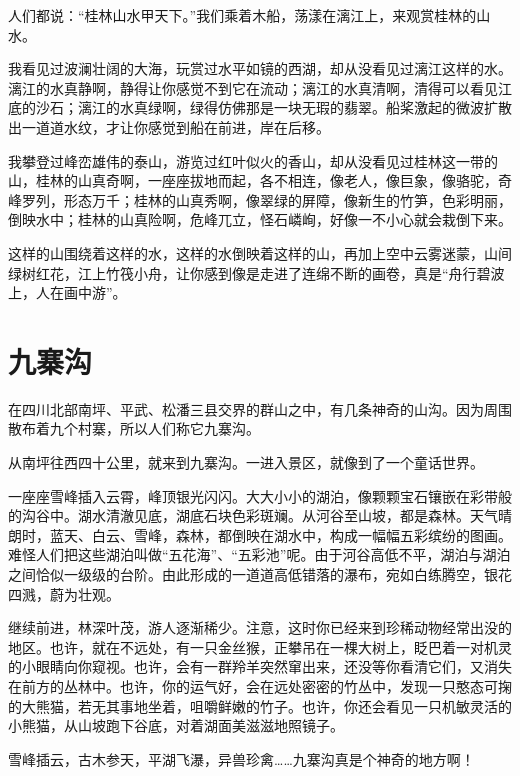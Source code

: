 \documentclass[12pt,UTF-8,openany]{ctexbook}
\begin{document}
\begin{large}
    
    人们都说：“桂林山水甲天下。”我们乘着木船，荡漾在漓江上，来观赏桂林的山水。
    
    我看见过波澜壮阔的大海，玩赏过水平如镜的西湖，却从没看见过漓江这样的水。漓江的水真静啊，静得让你感觉不到它在流动；漓江的水真清啊，清得可以看见江底的沙石；漓江的水真绿啊，绿得仿佛那是一块无瑕的翡翠。船桨激起的微波扩散出一道道水纹，才让你感觉到船在前进，岸在后移。
    
    我攀登过峰峦雄伟的泰山，游览过红叶似火的香山，却从没看见过桂林这一带的山，桂林的山真奇啊，一座座拔地而起，各不相连，像老人，像巨象，像骆驼，奇峰罗列，形态万千；桂林的山真秀啊，像翠绿的屏障，像新生的竹笋，色彩明丽，倒映水中；桂林的山真险啊，危峰兀立，怪石嶙峋，好像一不小心就会栽倒下来。
    
    这样的山围绕着这样的水，这样的水倒映着这样的山，再加上空中云雾迷蒙，山间绿树红花，江上竹筏小舟，让你感到像是走进了连绵不断的画卷，真是“舟行碧波上，人在画中游”。
    
\end{large}



\chapter{九寨沟}

\begin{large}
    
    在四川北部南坪、平武、松潘三县交界的群山之中，有几条神奇的山沟。因为周围散布着九个村寨，所以人们称它九寨沟。
    
    从南坪往西四十公里，就来到九寨沟。一进入景区，就像到了一个童话世界。
    
    一座座雪峰插入云霄，峰顶银光闪闪。大大小小的湖泊，像颗颗宝石镶嵌在彩带般的沟谷中。湖水清澈见底，湖底石块色彩斑斓。从河谷至山坡，都是森林。天气晴朗时，蓝天、白云、雪峰，森林，都倒映在湖水中，构成一幅幅五彩缤纷的图画。难怪人们把这些湖泊叫做“五花海”、“五彩池”呢。由于河谷高低不平，湖泊与湖泊之间恰似一级级的台阶。由此形成的一道道高低错落的瀑布，宛如白练腾空，银花四溅，蔚为壮观。
    
    继续前进，林深叶茂，游人逐渐稀少。注意，这时你已经来到珍稀动物经常出没的地区。也许，就在不远处，有一只金丝猴，正攀吊在一棵大树上，眨巴着一对机灵的小眼睛向你窥视。也许，会有一群羚羊突然窜出来，还没等你看清它们，又消失在前方的丛林中。也许，你的运气好，会在远处密密的竹丛中，发现一只憨态可掬的大熊猫，若无其事地坐着，咀嚼鲜嫩的竹子。也许，你还会看见一只机敏灵活的小熊猫，从山坡跑下谷底，对着湖面美滋滋地照镜子。
    
    雪峰插云，古木参天，平湖飞瀑，异兽珍禽……九寨沟真是个神奇的地方啊！
    
\end{large}
\end{document}
